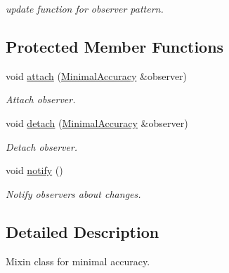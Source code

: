 \begin{DoxyCompactItemize}
\begin{DoxyCompactList}\small\item\em update function for observer pattern. \end{DoxyCompactList}\end{DoxyCompactItemize}
\subsection*{Protected Member Functions}
\begin{DoxyCompactItemize}
\item 
\hypertarget{classSpacy_1_1Mixin_1_1MixinConnection_abb5520ee6b22dd993d78f142939a1ed4}{}void \hyperlink{classSpacy_1_1Mixin_1_1MixinConnection_abb5520ee6b22dd993d78f142939a1ed4}{attach} (\hyperlink{classSpacy_1_1Mixin_1_1MinimalAccuracy}{Minimal\+Accuracy} \&observer)\label{classSpacy_1_1Mixin_1_1MixinConnection_abb5520ee6b22dd993d78f142939a1ed4}

\begin{DoxyCompactList}\small\item\em Attach observer. \end{DoxyCompactList}\item 
\hypertarget{classSpacy_1_1Mixin_1_1MixinConnection_adda739590c487679c26f60e50aedb73f}{}void \hyperlink{classSpacy_1_1Mixin_1_1MixinConnection_adda739590c487679c26f60e50aedb73f}{detach} (\hyperlink{classSpacy_1_1Mixin_1_1MinimalAccuracy}{Minimal\+Accuracy} \&observer)\label{classSpacy_1_1Mixin_1_1MixinConnection_adda739590c487679c26f60e50aedb73f}

\begin{DoxyCompactList}\small\item\em Detach observer. \end{DoxyCompactList}\item 
\hypertarget{classSpacy_1_1Mixin_1_1MixinConnection_a1ddeaa78a3bb4a38c2cca36d1f99fe36}{}void \hyperlink{classSpacy_1_1Mixin_1_1MixinConnection_a1ddeaa78a3bb4a38c2cca36d1f99fe36}{notify} ()\label{classSpacy_1_1Mixin_1_1MixinConnection_a1ddeaa78a3bb4a38c2cca36d1f99fe36}

\begin{DoxyCompactList}\small\item\em Notify observers about changes. \end{DoxyCompactList}\end{DoxyCompactItemize}


\subsection{Detailed Description}
Mixin class for minimal accuracy. 

